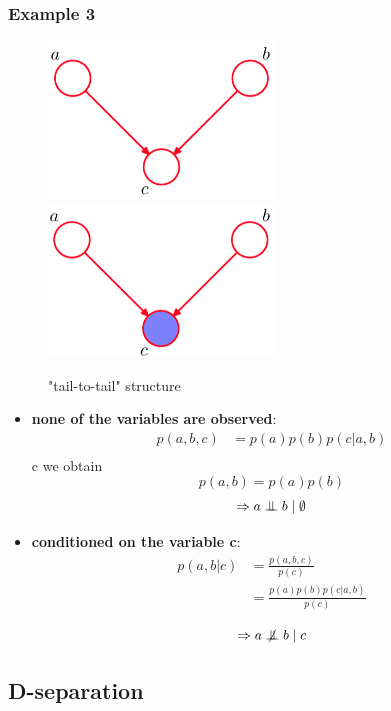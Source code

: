 \documentclass[a3paper, 12pt]{book} %
\newcommand{\CI}{\mathrel{\perp\mspace{-10mu}\perp}}
\newcommand{\nCI}{\centernot{\CI}}
\begin{document}
\subsubsection{Example 3}
\begin{figure}[htpb]
	\centering
	\includegraphics[width=6cm]{figures/bn_ex3_1.png}
	\includegraphics[width=6cm]{figures/bn_ex3_2.png}
	\caption{"tail-to-tail" structure}
	\label{fig:ci_example3}
\end{figure}
\begin{itemize}
	\item \textbf{none of the variables are observed}:
	\begin{equation}
		\begin{split}
		p(a,b,c) & = p(a)p(b)p(c|a,b)\\
		\end{split}
	\end{equation}
	 c we obtain
	$$p(a,b)=p(a)p(b)$$
	$$\Rightarrow a \CI b \mid \emptyset$$
	\item \textbf{conditioned on the variable c}:
	\begin{equation}
		\begin{split}
		p(a,b|c) & = \frac{p(a,b,c)}{p(c)} \\
		& = \frac{p(a)p(b)p(c|a,b)}{p(c)} \\
		\end{split}
	\end{equation}
	$$\Rightarrow a \nCI b \mid c$$
\end{itemize}
\subsection{D-separation}
\end{document}
